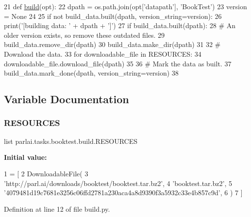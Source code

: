 \begin{DoxyCode}
21 \textcolor{keyword}{def }\hyperlink{namespacedialog__babi__feedback_1_1build_a7a9d289f7493a5ded13c4b7f071b6184}{build}(opt):
22     dpath = os.path.join(opt[\textcolor{stringliteral}{'datapath'}], \textcolor{stringliteral}{'BookTest'})
23     version = \textcolor{keywordtype}{None}
24 
25     \textcolor{keywordflow}{if} \textcolor{keywordflow}{not} build\_data.built(dpath, version\_string=version):
26         print(\textcolor{stringliteral}{'[building data: '} + dpath + \textcolor{stringliteral}{']'})
27         \textcolor{keywordflow}{if} build\_data.built(dpath):
28             \textcolor{comment}{# An older version exists, so remove these outdated files.}
29             build\_data.remove\_dir(dpath)
30         build\_data.make\_dir(dpath)
31 
32         \textcolor{comment}{# Download the data.}
33         \textcolor{keywordflow}{for} downloadable\_file \textcolor{keywordflow}{in} RESOURCES:
34             downloadable\_file.download\_file(dpath)
35 
36         \textcolor{comment}{# Mark the data as built.}
37         build\_data.mark\_done(dpath, version\_string=version)
38 \end{DoxyCode}


\subsection{Variable Documentation}
\mbox{\label{namespaceparlai_1_1tasks_1_1booktest_1_1build_a6b172b24eaec6c8e34cfeab0f22587ff}} 
\subsubsection{\texorpdfstring{R\+E\+S\+O\+U\+R\+C\+ES}{RESOURCES}}
{\footnotesize\ttfamily list parlai.\+tasks.\+booktest.\+build.\+R\+E\+S\+O\+U\+R\+C\+ES}

{\bfseries Initial value\+:}
\begin{DoxyCode}
1 =  [
2     DownloadableFile(
3         \textcolor{stringliteral}{'http://parl.ai/downloads/booktest/booktest.tar.bz2'},
4         \textcolor{stringliteral}{'booktest.tar.bz2'},
5         \textcolor{stringliteral}{'4079481d19c7681e3256c06ffd2781a230aca4a8d9390f3a5932c33e4b857c9d'},
6     )
7 ]
\end{DoxyCode}


Definition at line 12 of file build.\+py.

